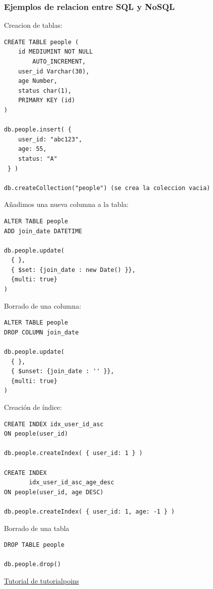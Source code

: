 \documentclass[4paper]{article}
\begin{document}
\newpage
\subsubsection{Ejemplos de relacion entre SQL y NoSQL}
Creacion de tablas:
\begin{lstlisting}
CREATE TABLE people (
    id MEDIUMINT NOT NULL
        AUTO_INCREMENT,
    user_id Varchar(30),
    age Number,
    status char(1),
    PRIMARY KEY (id)
)

db.people.insert( {
    user_id: "abc123",
    age: 55,
    status: "A"
 } )
 
db.createCollection("people") (se crea la coleccion vacia)
\end{lstlisting}
\newpage
Añadimos una nueva columna a la tabla:
\begin{lstlisting}
ALTER TABLE people
ADD join_date DATETIME

db.people.update( 
  { },
  { $set: {join_date : new Date() }},
  {multi: true}
)
\end{lstlisting}
\vspace{0.5cm}
Borrado de una columna:
\begin{lstlisting}
ALTER TABLE people
DROP COLUMN join_date

db.people.update( 
  { },
  { $unset: {join_date : '' }},
  {multi: true}
)
\end{lstlisting}
\vspace{0.5cm}
Creación de índice:
\begin{lstlisting}
CREATE INDEX idx_user_id_asc
ON people(user_id)

db.people.createIndex( { user_id: 1 } )

CREATE INDEX
       idx_user_id_asc_age_desc
ON people(user_id, age DESC)

db.people.createIndex( { user_id: 1, age: -1 } )
\end{lstlisting}
\vspace{0.5cm}
Borrado de una tabla
\begin{lstlisting}
DROP TABLE people

db.people.drop()
\end{lstlisting}

\vspace{1cm}
{\LARGE \href{https://www.tutorialspoint.com/mongodb/}{Tutorial de tutorialpoins}}

\newpage
\end{document}
